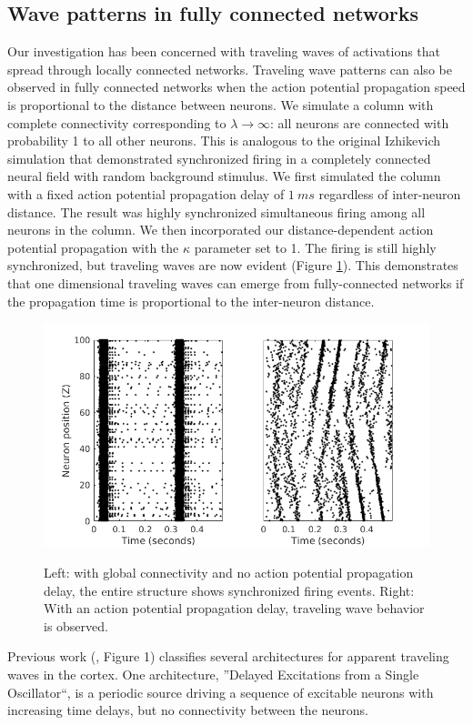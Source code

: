 \documentclass[a4paper,11pt]{article}
\begin{document}
\subsection{Wave patterns in fully connected networks} \label{sub:delay}
Our investigation has been concerned with traveling waves of activations that spread through locally connected networks.
Traveling wave patterns can also be observed in fully connected networks when the action potential propagation speed is proportional to the distance between neurons.
We simulate a column with complete connectivity corresponding to $\lambda \rightarrow \infty$: all neurons are connected with probability 1 to all other neurons.
This is analogous to the original Izhikevich simulation \cite{izzy_code} that demonstrated synchronized firing in a completely connected neural field with random background stimulus.
We first simulated the column with a fixed action potential propagation delay of $1~ms$ regardless of inter-neuron distance.
The result was highly synchronized simultaneous firing among all neurons in the column.
We then incorporated our distance-dependent action potential propagation with the $\kappa$ parameter set to 1.
The firing is still highly synchronized, but traveling waves are now evident (Figure \ref{fig:delay_waves}).
This demonstrates that one dimensional traveling waves can emerge from fully-connected networks if the propagation time is proportional to the inter-neuron distance.
\begin{figure}[!ht]
 \caption{Left: with global connectivity and no action potential propagation delay, the entire structure shows synchronized firing events. Right: With an action potential propagation delay, traveling wave behavior is observed.}
 \centering
   \includegraphics[width=\textwidth]{fig/DelayWaves}  
 \label{fig:delay_waves}
\end{figure}
Previous work (\cite{ermentrout2001}, Figure 1) classifies several architectures for apparent traveling waves in the cortex.
One architecture, ''Delayed Excitations from a Single Oscillator``, is a periodic source driving a sequence of excitable neurons with increasing time delays, but no connectivity between the neurons.
\end{document}

